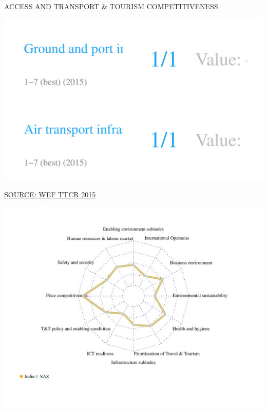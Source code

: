 \documentclass{article}\usepackage[]{graphicx}\usepackage[]{color}
\makeatletter
\def\maxwidth{ %
  \ifdim\Gin@nat@width>\linewidth
    \linewidth
  \else
    \Gin@nat@width
  \fi
}
\makeatother
\begin{document}
\begin{minipage}[c]{0.95\textwidth}
  \vspace{5ex}
  \begin{flushleft}  
    \hspace{4ex}\Large{\textcolor[HTML]{FF4023}{ACCESS AND TRANSPORT \& TOURISM COMPETITIVENESS}}\hspace{2ex}\small{\textcolor[HTML]{818181}{}}
  \end{flushleft}
  \begin{minipage}[c]{0.45\textwidth}
    \hspace{4ex}\small{\textcolor[HTML]{818181}{}}
    \vspace{1ex}


\hfill{}\includegraphics[width=\maxwidth]{figure/number4_1-1} 



    \hspace{4ex}\scriptsize{\href{NA}{\textcolor[HTML]{FF4023}{SOURCE: WEF TTCR 2015}}}
  \end{minipage}  
  \begin{minipage}[c]{0.55\textwidth}
    \hspace{4ex}\small{\textcolor[HTML]{818181}{}}
    \vspace{1ex}


\hfill{}\includegraphics[width=\maxwidth]{figure/radar3_1-1} 




\end{minipage}
\end{minipage}
\end{document}
